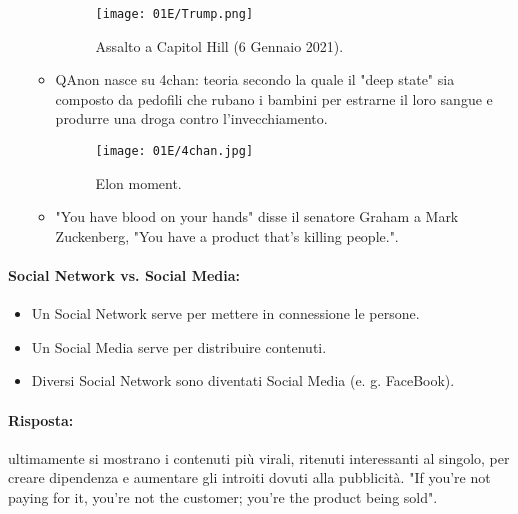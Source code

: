 \begin{itemize}
\begin{itemize}
\begin{figure}[h]
    \centering
    \texttt{[image: 01E/Trump.png]}
    \caption{Assalto a Capitol Hill (6 Gennaio 2021).}
\end{figure}
\item QAnon nasce su 4chan: teoria secondo la quale il "deep state" sia composto da pedofili che rubano i bambini per estrarne il loro sangue e produrre una droga contro l'invecchiamento.
  \begin{figure}[h]
    \centering
    \texttt{[image: 01E/4chan.jpg]}
    \caption{Elon moment.}
\end{figure}
\item "You have blood on your hands" disse il senatore Graham a Mark Zuckenberg, "You have a product that's killing people.". 
    \end{itemize}
\end{itemize}

\paragraph{Social Network vs. Social Media:}

\begin{itemize}
  \item Un Social Network serve per mettere in connessione le persone. 
  \item Un Social Media serve per distribuire contenuti. 
  \item Diversi Social Network sono diventati Social Media (e. g. FaceBook).
\end{itemize}


\paragraph{Risposta:} ultimamente si mostrano i contenuti più virali, ritenuti interessanti al singolo, per creare dipendenza e aumentare gli introiti dovuti alla pubblicità. "If you're not paying for it, you're not the customer; you're the product being sold".









